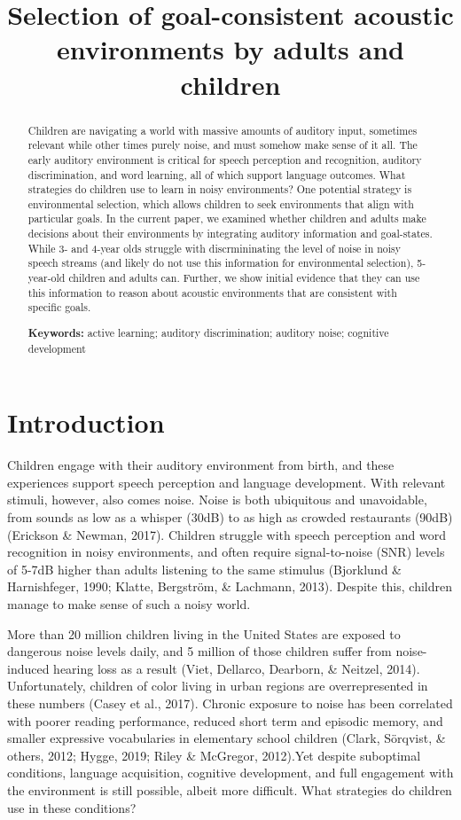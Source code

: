 \documentclass[10pt, letterpaper]{article}
\title{Selection of goal-consistent acoustic environments by adults and
children}
\begin{document}
\maketitle

\begin{abstract}
Children are navigating a world with massive amounts of auditory input,
sometimes relevant while other times purely noise, and must somehow make
sense of it all. The early auditory environment is critical for speech
perception and recognition, auditory discrimination, and word learning,
all of which support language outcomes. What strategies do children use
to learn in noisy environments? One potential strategy is environmental
selection, which allows children to seek environments that align with
particular goals. In the current paper, we examined whether children and
adults make decisions about their environments by integrating auditory
information and goal-states. While 3- and 4-year olds struggle with
discrmininating the level of noise in noisy speech streams (and likely
do not use this information for environmental selection), 5-year-old
children and adults can. Further, we show initial evidence that they can
use this information to reason about acoustic environments that are
consistent with specific goals.

\textbf{Keywords:}
active learning; auditory discrimination; auditory noise; cognitive
development
\end{abstract}

\hypertarget{introduction}{%
\section{Introduction}\label{introduction}}

Children engage with their auditory environment from birth, and these
experiences support speech perception and language development. With
relevant stimuli, however, also comes noise. Noise is both ubiquitous
and unavoidable, from sounds as low as a whisper (30dB) to as high as
crowded restaurants (90dB) (Erickson \& Newman, 2017). Children struggle
with speech perception and word recognition in noisy environments, and
often require signal-to-noise (SNR) levels of 5-7dB higher than adults
listening to the same stimulus (Bjorklund \& Harnishfeger, 1990; Klatte,
Bergström, \& Lachmann, 2013). Despite this, children manage to make
sense of such a noisy world.

More than 20 million children living in the United States are exposed to
dangerous noise levels daily, and 5 million of those children suffer
from noise-induced hearing loss as a result (Viet, Dellarco, Dearborn,
\& Neitzel, 2014). Unfortunately, children of color living in urban
regions are overrepresented in these numbers (Casey et al., 2017).
Chronic exposure to noise has been correlated with poorer reading
performance, reduced short term and episodic memory, and smaller
expressive vocabularies in elementary school children (Clark, Sörqvist,
\& others, 2012; Hygge, 2019; Riley \& McGregor, 2012).Yet despite
suboptimal conditions, language acquisition, cognitive development, and
full engagement with the environment is still possible, albeit more
difficult. What strategies do children use in these conditions?
\end{document}
